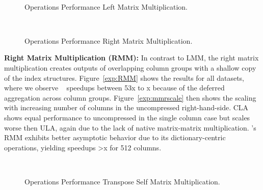 \begin{figure}[!t]
	\hfill
	~\vspace{-0.4cm}\\

	\caption{\label{exp:opsLMM}Operations Performance Left Matrix Multiplication.}
\end{figure}

\begin{figure}[!t]
	\hfill
	~\vspace{-0.4cm}\\
	\caption{\label{exp:opsRMM}Operations Performance Right Matrix Multiplication.}
	\vspace{-0.4cm}
\end{figure}

\textbf{Right Matrix Multiplication (RMM):}
In contrast to LMM, the right matrix multiplication creates outputs of overlapping column groups with a shallow copy of the index structures.
Figure~\ref{exp:RMM} shows the results for all datasets, where we observe \name~ speedups between
53x to x
because of the deferred aggregation across column groups.
Figure~\ref{exp:mmrscale} then shows the scaling with increasing number of columns in the uncompressed right-hand-side.
CLA shows equal performance to uncompressed in the single column case but scales worse then ULA, again due to the lack of native matrix-matrix multiplication.
\name's RMM exhibits better asymptotic behavior due to its dictionary-centric operations,
yielding speedups >x for 512 columns.

\begin{figure}[!t]
	\hfill
	~\vspace{-0.4cm}\\
	\caption{\label{exp:opsTSMM}Operations Performance Transpose Self Matrix Multiplication.}
	\vspace{-0.4cm}
\end{figure}

